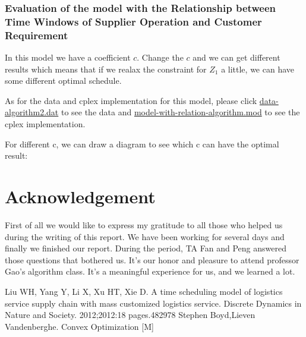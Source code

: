 \documentclass[12pt,a4paper]{article}
\begin{document}
\subsubsection{Evaluation of the model with the Relationship between Time Windows of Supplier Operation and Customer Requirement}
In this model we have a coefficient $c$. Change the $c$ and we can get different results which means that if we realax the constraint for $Z_1$ a little, we can have some different optimal schedule.

As for the data and cplex implementation for this model, please click \href{run:data-algorithm2.dat}{data-algorithm2.dat} to see the data and \href{run:model-with-relation-algorithm.mod}{model-with-relation-algorithm.mod} to see the cplex implementation.

For different c, we can draw a diagram to see which c can have the optimal result:

\section*{Acknowledgement}
First of all we would like to express my gratitude to all those who helped us during the writing of this report. We have been working for several days and finally we finished our report. During the period, TA Fan and Peng answered those questions that bothered us. It's our honor and pleasure to attend professor Gao's algorithm class. It's a meaningful experience for us, and we learned a lot.

\begin{thebibliography}{1}
  Liu WH, Yang Y, Li X, Xu HT, Xie D. A time scheduling model of logistics service supply chain with mass customized logistics service. Discrete Dynamics in Nature and Society. 2012;2012:18 pages.482978
 Stephen Boyd,Lieven Vandenberghe. Convex Optimization [M]
\end{thebibliography}
\
\end{document}
